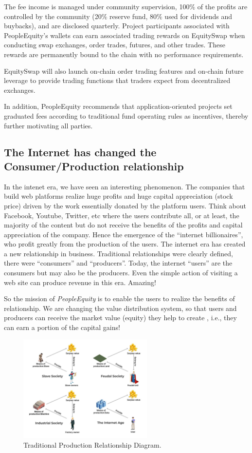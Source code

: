 \documentclass{article}
\begin{document}
The fee income is managed under community supervision, 100\% of the profits are controlled by the community (20\% reserve fund, 80\% used for dividends and buybacks), and are disclosed quarterly. Project participants associated with PeopleEquity's wallets can earn associated trading rewards on EquitySwap when conducting swap exchanges, order trades, futures, and other trades. These rewards are permanently bound to the chain with no performance requirements.

EquitySwap will also launch on-chain order trading features and on-chain future leverage to provide trading functions that traders expect from decentralized exchanges.

In addition, PeopleEquity recommends that application-oriented projects set graduated fees according to traditional fund operating rules as incentives, thereby further motivating all parties.


\subsection{The Internet has changed the Consumer/Production relationship}

In the intenet era, we have seen an interesting phenomenon. The companies that build web platforms realize huge profits and huge capital appreciation (stock price) driven by the work essentially donated by the platform users. Think about Facebook, Youtube, Twitter, etc where the users contribute all, or at least, the majority of the content but do not receive the benefits of the profits and capital appreciation of the company. Hence the emergence of the “internet billionaires”, who profit greatly from the production of the users. The internet era has created a new relationship in business. Traditional relationships were clearly defined, there were “consumers” and “producers”. Today, the internet “users” are the consumers but may also be the producers. Even the simple action of visiting a web site can produce revenue in this era. Amazing!

So the mission of \emph{PeopleEquity} is to enable the users to realize the benefits of relationship. We are changing the value distribution system, so that users and producers can receive the market value (equity) they help to create , i.e., they can earn a portion of the capital gains!

\begin{figure}
\centering
\includegraphics[width=0.6\textwidth]{./img/tranditional_prp.png}
\caption{\label{fig}Traditional Production Relationship Diagram.}
\end{figure}
\end{document}

